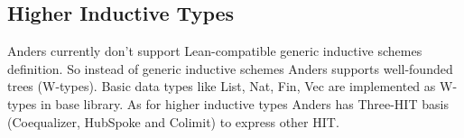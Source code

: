 \documentclass[a4paper,UKenglish,cleveref, autoref, thm-restate]{lipics-v2021}
\begin{document}
\newpage
\subsection{Higher Inductive Types}

Anders currently don’t support Lean-compatible generic inductive schemes
definition. So instead of generic inductive schemes Anders supports well-founded trees (W-types).
Basic data types like List, Nat, Fin, Vec are implemented as W-types in base library.
As for higher inductive types Anders has Three-HIT basis (Coequalizer, HubSpoke and Colimit) to express other HIT.


\end{document}
